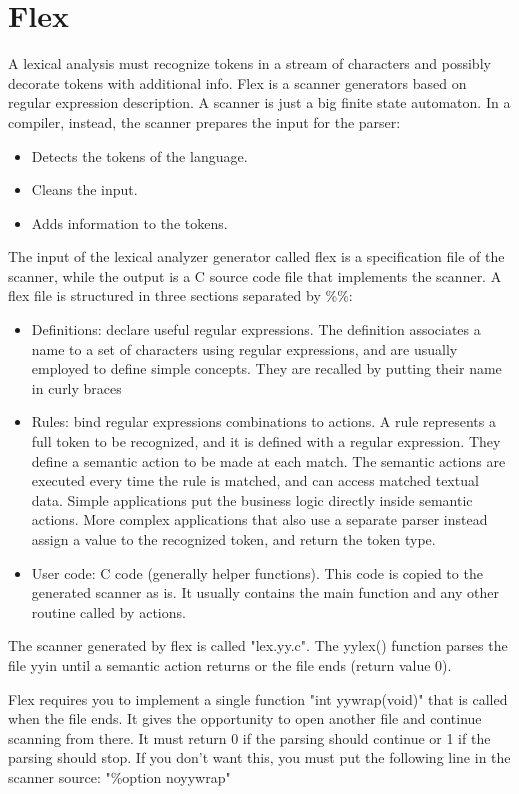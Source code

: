 \documentclass[12pt, a4paper]{report}
\newtheorem[style=M, bodystyle=\normalfont]{operation}{Operation}
\newtheorem[style=M, bodystyle=\normalfont]{theorem}{Theorem}
\newtheorem[style=M, bodystyle=\normalfont]{corollary}{Corollary}
\newtheorem[style=M, bodystyle=\normalfont]{lemma}{Lemma}
\newtheorem[style=M, bodystyle=\normalfont]{definition}{Definition}
\begin{document}
    \section{Flex}
    A lexical analysis must recognize tokens in a stream of characters and possibly decorate tokens with additional info. Flex is a scanner generators based on regular 
    expression description. A scanner is just a big finite state automaton. In a compiler, instead, the scanner prepares the input for the parser:
    \begin{itemize}
        \item Detects the tokens of the language. 
        \item Cleans the input. 
        \item Adds information to the tokens. 
    \end{itemize}
    The input of the lexical analyzer generator called flex is a specification file of the scanner, while the output is a C source code file that implements the scanner. 
    A flex file is structured in three sections separated by $\%\%$:
    \begin{itemize}
        \item Definitions: declare useful regular expressions. The definition associates a name to a set of characters using regular expressions, and are usually employed 
            to define simple concepts. They are recalled by putting their name in curly braces
        \item Rules: bind regular expressions combinations to actions. A rule represents a full token to be recognized, and it is defined with a regular expression. They 
            define a semantic action to be made at each match. The semantic actions are executed every time the rule is matched, and can access matched textual data. 
            Simple applications put the business logic directly inside semantic actions. More complex applications that also use a separate parser instead assign a value 
            to the recognized token, and return the token type. 
        \item User code: C code (generally helper functions). This code is copied to the generated scanner as is. It usually contains the main function and any other 
            routine called by actions. 
    \end{itemize}
    The scanner generated by flex is called "lex.yy.c". The yylex() function parses the file yyin until a semantic action returns or the file ends (return value 0). 

    Flex requires you to implement a single function "int yywrap(void)" that is called when the file ends. It gives the opportunity to open another file and continue 
    scanning from there. It must return 0 if the parsing should continue or 1 if the parsing should stop. If you don’t want this, you must put the following line
    in the scanner source: "$\%$option noyywrap"
\end{document}
